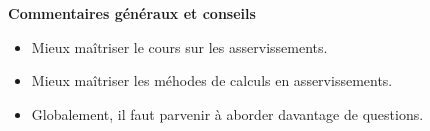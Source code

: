 \documentclass[10pt,fleqn]{book} %
\begin{document}

\pagestyle{fancy}
\thispagestyle{plain}


\def\columnseprulecolor{\color{ocre}}
\setlength{\columnseprule}{0.4pt} 



\vspace{6cm}


\textbf{Commentaires généraux et conseils}

\begin{itemize}
\item Mieux maîtriser le cours sur les asservissements.
\item Mieux maîtriser les méhodes de calculs en asservissements.
\item Globalement, il faut parvenir à aborder davantage de questions.
\end{itemize}



%
\end{document}
